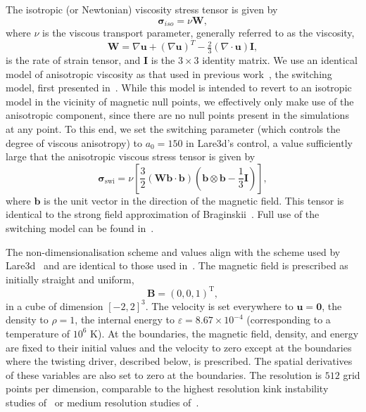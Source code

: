 \documentclass[12pt]{article}
\newcommand{\ten}[1]{{\bm #1}}
\renewcommand{\vec}[1]{{\bm #1}}
\begin{document}
The isotropic (or Newtonian) viscosity stress tensor is given by
\begin{equation}
  \label{eq:isotropic_viscous_tensor}
  \ten{\sigma}_{iso} = \nu \ten{W},
\end{equation}
where $\nu$ is the viscous transport parameter, generally referred to as the viscosity,
\begin{equation}
  \label{eq:rate_of_strain}
  \ten{W} = \nabla\vec{u} + (\nabla\vec{u})^T - \tfrac{2}{3}(\nabla \cdot \vec{u})\ten{I},
\end{equation}
is the rate of strain tensor, and $\ten{I}$ is the  $3\times 3$ identity matrix. We use an identical model of anisotropic viscosity as that used in previous work~\cite{quinnEffectAnisotropicViscosity2020a}, the switching model, first presented in~\cite{mactaggartBraginskiiMagnetohydrodynamicsArbitrary2017}. While this model is intended to revert to an isotropic model in the vicinity of magnetic null points, we effectively only make use of the anisotropic component, since there are no null points present in the simulations at any point. To this end, we set the switching parameter (which controls the degree of viscous anisotropy) to $a_0 = 150$ in Lare3d's control, a value sufficiently large that the anisotropic viscous stress tensor is given by
\begin{equation}
  \label{eq:switching_model}
\ten{\sigma}_{\text{swi}} = \nu \left[\frac{3}{2}(\ten{W}\vec{b}\cdot\vec{b}) \left( \vec{b} \otimes \vec{b} - \frac{1}{3}\ten{I} \right)\right],
\end{equation}
where $\vec{b}$ is the unit vector in the direction of the magnetic field. This tensor is identical to the strong field approximation of Braginskii~\cite{braginskiiTransportProcessesPlasma1965}. Full use of the switching model can be found in~\cite{mactaggartBraginskiiMagnetohydrodynamicsArbitrary2017,quinnEffectAnisotropicViscosity2020a}.

The non-dimensionalisation scheme and values align with the scheme used by Lare3d~\cite{arberStaggeredGridLagrangian2001} and are identical to those used in~\cite{quinnEffectAnisotropicViscosity2020a}. The magnetic field is prescribed as initially straight and uniform,
\begin{equation}
\vec{B} = (0, 0, 1)^{\text{T}},
\end{equation}
in a cube of dimension $[-2,2]^3$. The velocity is set everywhere to $\vec{u} = \vec{0}$, the density to $\rho = 1$, the internal energy to $\varepsilon = 8.67\times 10^{-4}$ (corresponding to a temperature of $10^6$ K).  At the boundaries, the magnetic field, density, and energy are fixed to their initial values and the velocity to zero except at the boundaries where the twisting driver, described below, is prescribed. The spatial derivatives of these variables are also set to zero at the boundaries. The resolution is $512$ grid points per dimension, comparable to the highest resolution kink instability studies of~\cite{hoodCoronalHeatingMagnetic2009} or medium resolution studies of~\cite{barefordShockHeatingNumerical2015}. 
\end{document}
